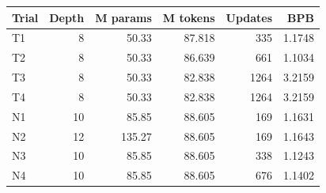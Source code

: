\begin{tabular}{lrrrrr}
\toprule
Trial & Depth & M params & M tokens & Updates & BPB \\
\midrule
T1 & 8 & 50.33 & 87.818 & 335 & 1.1748 \\
T2 & 8 & 50.33 & 86.639 & 661 & 1.1034 \\
T3 & 8 & 50.33 & 82.838 & 1264 & 3.2159 \\
T4 & 8 & 50.33 & 82.838 & 1264 & 3.2159 \\
N1 & 10 & 85.85 & 88.605 & 169 & 1.1631 \\
N2 & 12 & 135.27 & 88.605 & 169 & 1.1643 \\
N3 & 10 & 85.85 & 88.605 & 338 & 1.1243 \\
N4 & 10 & 85.85 & 88.605 & 676 & 1.1402 \\
\bottomrule
\end{tabular}
